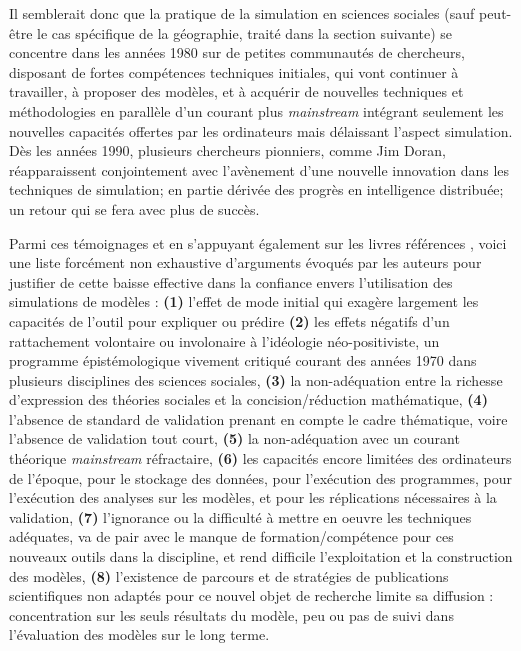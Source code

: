 Il semblerait donc que la pratique de la simulation en sciences sociales (sauf peut-être le cas spécifique de la géographie, traité dans la section suivante) se concentre dans les années 1980 sur de petites communautés de chercheurs, disposant de fortes compétences techniques initiales, qui vont continuer à travailler, à proposer des modèles, et à acquérir de nouvelles techniques et méthodologies en parallèle d'un courant plus \textit{mainstream} intégrant seulement les nouvelles capacités offertes par les ordinateurs mais délaissant l'aspect simulation. Dès les années 1990, plusieurs chercheurs pionniers, comme Jim Doran, réapparaissent conjointement avec l’avènement d'une nouvelle innovation dans les techniques de simulation; en partie dérivée des progrès en intelligence distribuée; un retour qui se fera avec plus de succès.

Parmi ces témoignages et en s'appuyant également sur les livres références \autocite{Naylor1966,Guetzkow1972,Dutton1971}, voici une liste forcément non exhaustive d'arguments évoqués par les auteurs pour justifier de cette baisse effective dans la confiance envers l'utilisation des simulations de modèles : \textbf{(1)} l'effet de mode initial qui exagère largement les capacités de l'outil pour expliquer ou prédire \textbf{(2)} les effets négatifs d'un rattachement volontaire ou involonaire à l'idéologie néo-positiviste, un programme épistémologique vivement critiqué courant des années 1970 dans plusieurs disciplines des sciences sociales, \textbf{(3)} la non-adéquation entre la richesse d'expression des théories sociales et la concision/réduction mathématique, \textbf{(4)} l'absence de standard de validation prenant en compte le cadre thématique, voire l'absence de validation tout court, \textbf{(5)} la non-adéquation avec un courant théorique \textit{mainstream} réfractaire, \textbf{(6)} les capacités encore limitées des ordinateurs de l'époque, pour le stockage des données, pour l'exécution des programmes, pour l'exécution des analyses sur les modèles, et pour les réplications nécessaires à la validation, \textbf{(7)} l'ignorance ou la difficulté à mettre en oeuvre les techniques adéquates, va de pair avec le manque de formation/compétence pour ces nouveaux outils dans la discipline, et rend difficile l'exploitation et la construction des modèles, \textbf{(8)} l'existence de parcours et de stratégies de publications scientifiques non adaptés pour ce nouvel objet de recherche limite sa diffusion : concentration sur les seuls résultats du modèle, peu ou pas de suivi dans l'évaluation des modèles sur le long terme.

